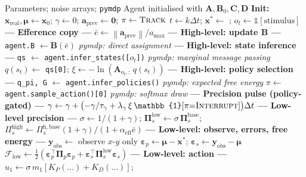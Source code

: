 \documentclass[11pt, a4paper]{article}
\newcommand{\vect}[1]{\bm{#1}}
\newcommand{\mat}[1]{\mathbf{#1}}
\newcommand{\FE}{\mathcal{F}}
\newcommand{\norm}[1]{\left\|#1\right\|}
\newcommand{\Pip}{\mat{\Pi}_p}
\newcommand{\Pisl}{\mat{\Pi}_s^{\mathrm{low}}}
\newcommand{\Pish}{\Pi_s^{\mathrm{high}}}
\newcommand{\epsp}{\vect{\varepsilon}_p}
\newcommand{\epss}{\vect{\varepsilon}_s}
\begin{document}
\begin{algorithm}[H]
\caption{Hierarchical AIF — \texttt{pymdp} High-Level Agent}
\label{alg:pymdp}
\begin{algorithmic}[1]
\Require Parameters; noise arrays; \texttt{pymdp} Agent initialised with
         $\mat{A}, \mat{B}_0, \mat{C}, \mat{D}$
\State \textbf{Init:} $\vect{x}_{\mathrm{real}}, \vect{\mu} \leftarrow \vect{x}_0$;\;
       $\gamma \leftarrow 0$;\;
       $\vect{a}_{\mathrm{prev}} \leftarrow \vect{0}$;\;
       $\pi \leftarrow \textsc{Track}$
  \State $t \leftarrow k\Delta t$;\quad
         $\vect{x}^* \leftarrow$ ;\quad
         $o_t \leftarrow \mathbb{1}[\text{stimulus}]$
  \State
  \State \textbf{--- Efference copy ---}
  \State $\bar{e} \leftarrow \norm{\vect{a}_{\mathrm{prev}}}/a_{\max}$
  \State
  \State \textbf{--- High-level: update B ---}
  \State \texttt{agent.B} $\leftarrow \mat{B}(\bar{e})$
         \hfill{\color{aifpurple}\textit{pymdp: direct assignment}}
  \State
  \State \textbf{--- High-level: state inference ---}
  \State \texttt{qs} $\leftarrow$ \texttt{agent.infer\_states([}$o_t$\texttt{])}
         \hfill{\color{aifpurple}\textit{pymdp: marginal message passing}}
  \State $q(s_t) \leftarrow$ \texttt{qs[0]};\quad
         $\xi \leftarrow -\ln(\mat{A}_{o_t,:}\,q(s_t))$
  \State
  \State \textbf{--- High-level: policy selection ---}
  \State \texttt{q\_pi, G} $\leftarrow$ \texttt{agent.infer\_policies()}
         \hfill{\color{aifpurple}\textit{pymdp: expected free energy}}
  \State $\pi \leftarrow$ \texttt{agent.sample\_action()[0]}
         \hfill{\color{aifpurple}\textit{pymdp: softmax draw}}
  \State
  \State \textbf{--- Precision pulse (policy-gated) ---}
  \State $\gamma \leftarrow \gamma
         + \bigl(-\gamma/\tau_\gamma
         + \lambda_\gamma\,\xi\,\mathbb{1}[\pi{=}\textsc{Interrupt}]\bigr)\Delta t$
  \State
  \State \textbf{--- Low-level precision ---}
  \State $\sigma \leftarrow 1/(1+\gamma)$;\quad
         $\Pisl \leftarrow \sigma\,\mat{\Pi}_s^{\mathrm{base}}$;\quad
         $\Pish \leftarrow \Pi_s^{\mathrm{h,base}}(1+\gamma)/(1+\alpha_{\mathrm{eff}}\bar{e})$
  \State
  \State \textbf{--- Low-level: observe, errors, free energy ---}
  \State $\vect{y}_{\mathrm{obs}} \leftarrow$ observe $x$-$y$ only
  \State $\epsp \leftarrow \vect{\mu} - \vect{x}^*$;\quad
         $\epss \leftarrow \vect{y}_{\mathrm{obs}} - \vect{\mu}$
  \State $\FE_{\mathrm{low}} \leftarrow
         \tfrac{1}{2}(\epsp^\top\Pip\epsp + \epss^\top\Pisl\epss)$
  \State
  \State \textbf{--- Low-level: action ---}
  \State $u_1 \leftarrow \sigma\,m_1[K_P(\ldots) + K_D(\ldots)]$;\quad

\end{algorithmic}
\end{algorithm}
\end{document}
